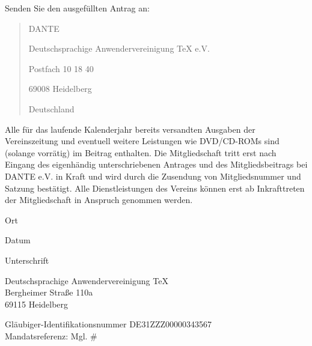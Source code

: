 \documentclass[ngerman,dvips]{article}
\begin{document}
Senden Sie den ausgef\"{u}llten Antrag an:
\begin{quote}
DANTE

Deutschsprachige Anwendervereinigung \TeX{} e.V.

Postfach 10 18 40

69008 Heidelberg

Deutschland
\end{quote}
Alle f\"{u}r das laufende Kalenderjahr bereits versandten Ausgaben der Vereinszeitung und eventuell weitere Leistungen
wie DVD/CD-ROMs sind (solange vorr\"{a}tig) im Beitrag enthalten. Die Mitgliedschaft tritt erst nach Eingang des
eigenh\"{a}ndig unterschriebenen Antrages und des Mitgliedsbeitrags bei DANTE e.V. in Kraft und wird durch die Zusendung
von Mitgliedsnummer und Satzung best\"{a}tigt. Alle Dienstleistungen des Vereins k\"{o}nnen erst ab Inkrafttreten
der Mitgliedschaft in Anspruch genommen werden.

\vspace{22pt}

\begin{minipage}{0.2\textwidth}
\begin{center}
\dotfill

Ort
\end{center}
\end{minipage}\hfill
\begin{minipage}{0.15\textwidth}
\begin{center}
\dotfill

Datum
\end{center}
\end{minipage}\hfill
\begin{minipage}{0.5\textwidth}
\begin{center}
\dotfill

Unterschrift
\end{center}
\end{minipage}


\newpage

\renewcommand\thesubsection{\arabic{subsection}.}

\begin{flushright}
{\Huge\DANTE} \hfill Deutschsprachige Anwendervereinigung \TeX\ \eV\\
Bergheimer Straße 110a\\
69115 Heidelberg
\end{flushright}

\bigskip
Gläubiger-Identifikationsnummer DE31ZZZ00000343567\\[5pt]
Mandatsreferenz: Mgl. \# %
\\[1cm]
\end{document}
